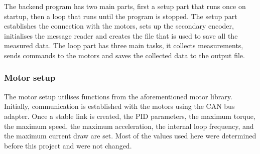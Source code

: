 \documentclass[12pt]{article}
\begin{document}
The backend program has two main parts, first a setup part that runs once on startup, then a loop that runs until the program is stopped. The setup part establishes the connection with the motors, sets up the secondary encoder, initialises the message reader and creates the file that is used to save all the measured data. The loop part has three main tasks, it collects measurements, sends commands to the motors and saves the collected data to the output file.  


\subsubsection{Motor setup}
The motor setup utilises functions from the aforementioned motor library. Initially, communication is established with the motors using the CAN bus adapter. Once a stable link is created, the PID parameters, the maximum torque, the maximum speed, the maximum acceleration, the internal loop frequency, and the maximum current draw are set. Most of the values used here were determined before this project and were not changed.
\end{document}
